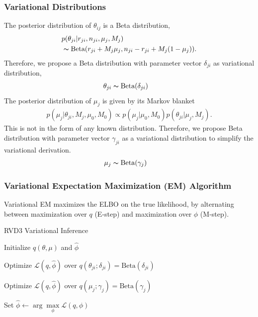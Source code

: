 \documentclass[11pt,reqno]{amsart}
\begin{document}
\subsubsection{Variational Distributions}
The posterior distribution of $\theta_{ij}$ is a Beta distribution,
\begin{align}
&p(\theta_{ji}|r_{ji},n_{ji},\mu_j,M_j)\\
&\thicksim \text{Beta}(r_{ji}+M_j \mu_j, n_{ji}-r_{ji}+M_j(1-\mu_j)).
\end{align}
Therefore, we propose a Beta distribution with parameter vector $\delta_{ji}$ as variational distribution,
\begin{align}
\theta_{ji} &\thicksim \text{Beta}(\delta_{ji}) \nonumber
\end{align}
%
The posterior distribution of $\mu_j$ is given by its Markov blanket
\begin{align}
p(\mu_j|\theta_{ji},M_j,\mu_0,M_0)\propto p(\mu_j|\mu_0,M_0)p(\theta_{ji}|\mu_j,M_j).
\end{align}
This is not in the form of any known distribution.
Therefore, we propose Beta distribution with parameter vector $\gamma_{ji}$ as a variational distribution to simplify the variational derivation.
\begin{align}
\mu_j &\thicksim \text{Beta}(\gamma_j) \nonumber
\end{align}

\subsubsection{Variational Expectation Maximization (EM) Algorithm}
Variational EM maximizes the ELBO on the true likelihood, by alternating between maximization over $q$ (E-step) and maximization over $\phi$ (M-step).

\begin{algorithm}[h]
  \caption{RVD3 Variational Inference}

  \begin{algorithmic}[1]

  \State Initialize $ q(\theta, \mu) $ and $\hat{\phi}$

  \Repeat

	\Repeat
	
			\State Optimize $\mathcal{L}(q, \hat{\phi})$ over $q(\theta_{ji}; \delta_{ji}) = \text{Beta} (\delta_{ji})$				
			\EndFor			
		\EndFor
	
			\State Optimize $\mathcal{L}(q, \hat{\phi})$ over $q(\mu_j; \gamma_j) = \text{Beta} (\gamma_j)$			
		\EndFor
	

  \State Set $\hat{\phi} \leftarrow \arg \max\limits_{\phi}
            \mathcal{L}(q,\phi)$

  \end{algorithmic}

\end{algorithm}
\end{document}
